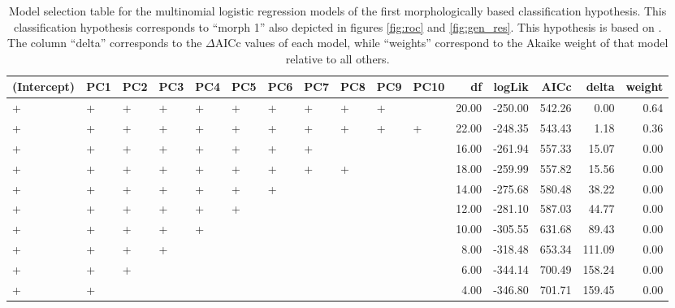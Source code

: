 \documentclass[12pt,letterpaper]{article}\usepackage{graphicx, color}
\begin{document}
\begin{table}
  \centering
{\small
\begin{tabular}{lllllllllllrrrrr}
  \hline
(Intercept) & PC1 & PC2 & PC3 & PC4 & PC5 & PC6 & PC7 & PC8 & PC9 & PC10 & df & logLik & AICc & delta & weight \\ 
  \hline
+ & + & + & + & + & + & + & + & + & + &  & 20.00 & -250.00 & 542.26 & 0.00 & 0.64 \\ 
  + & + & + & + & + & + & + & + & + & + & + & 22.00 & -248.35 & 543.43 & 1.18 & 0.36 \\ 
  + & + & + & + & + & + & + & + &  &  &  & 16.00 & -261.94 & 557.33 & 15.07 & 0.00 \\ 
  + & + & + & + & + & + & + & + & + &  &  & 18.00 & -259.99 & 557.82 & 15.56 & 0.00 \\ 
  + & + & + & + & + & + & + &  &  &  &  & 14.00 & -275.68 & 580.48 & 38.22 & 0.00 \\ 
  + & + & + & + & + & + &  &  &  &  &  & 12.00 & -281.10 & 587.03 & 44.77 & 0.00 \\ 
  + & + & + & + & + &  &  &  &  &  &  & 10.00 & -305.55 & 631.68 & 89.43 & 0.00 \\ 
  + & + & + & + &  &  &  &  &  &  &  & 8.00 & -318.48 & 653.34 & 111.09 & 0.00 \\ 
  + & + & + &  &  &  &  &  &  &  &  & 6.00 & -344.14 & 700.49 & 158.24 & 0.00 \\ 
  + & + &  &  &  &  &  &  &  &  &  & 4.00 & -346.80 & 701.71 & 159.45 & 0.00 \\ 
   \hline
\end{tabular}
}


  \caption{Model selection table for the multinomial logistic regression models of the first morphologically based classification hypothesis. This classification hypothesis corresponds to ``morph 1'' also depicted in figures \ref{fig:roc} and \ref{fig:gen_res}. This hypothesis is based on \citet{Seeliger1945}. The column ``delta'' corresponds to the \(\Delta\)AICc values of each model, while ``weights'' correspond to the Akaike weight of that model relative to all others.}
  \label{tab:mod_sel_1}
\end{table}
\end{document}
